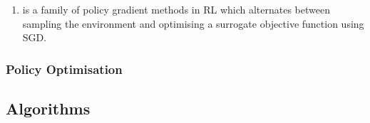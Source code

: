 \begin{enumerate}
    \item \textbf{} is a family of policy gradient methods in \gls{RL} which alternates between sampling the environment and optimising a surrogate objective function using \gls{SGD}.
    

\end{enumerate}

\subsubsection{Policy Optimisation}






\subsection{Algorithms}\label{ssec:algorithms}


